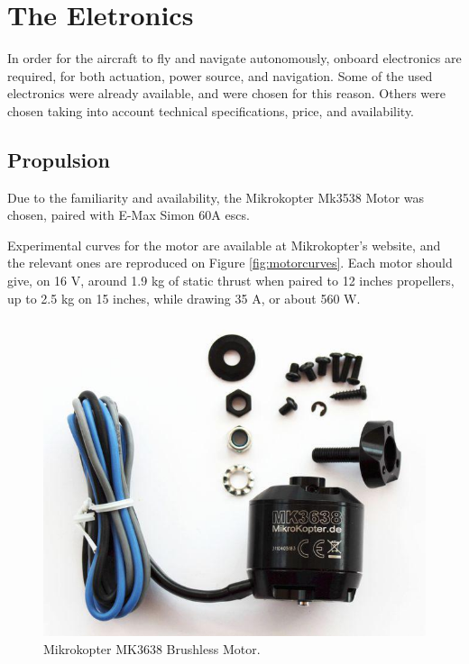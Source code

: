 
\chapter{The Eletronics} \label{chap:electronics}

In order for the aircraft to fly and navigate autonomously, onboard electronics are required, for both actuation, power source, and navigation. Some of the used electronics were already available, and were chosen for this reason. Others were chosen taking into account technical specifications, price, and availability.
	
\section{Propulsion}

Due to the familiarity and availability, the Mikrokopter Mk3538 Motor was chosen, paired with E-Max Simon 60A escs.

Experimental curves for the motor are available at Mikrokopter's website, and the relevant ones are reproduced on Figure \ref{fig:motorcurves}. Each motor should give, on 16 V, around 1.9 kg of static thrust when paired to 12 inches propellers, up to 2.5 kg on 15 inches, while drawing 35 A, or about 560 W.

\begin{figure}[H]
\centering
  \includegraphics[width=0.8\linewidth]{figs/mk3638.jpg}
  \caption{Mikrokopter MK3638 Brushless Motor.}
  \label{fig:mk3638}
\end{figure}

